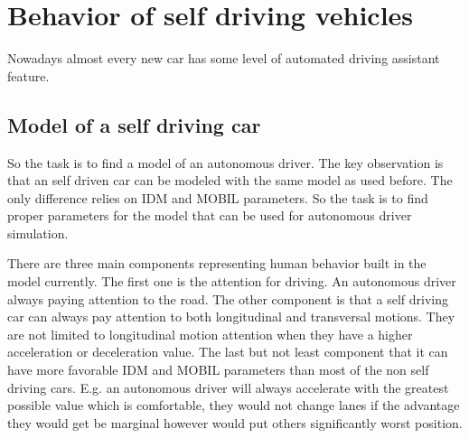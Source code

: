\chapter{Behavior of self driving vehicles}
		Nowadays almost every new car has some level of automated driving assistant feature.
	\section{Model of a self driving car}
		So the task is to find a model of an autonomous driver. The key observation is that an self driven car can be modeled with the same model as used before. The only difference relies on IDM and MOBIL parameters. So the task is to find proper parameters for the model that can be used for autonomous driver simulation.

		There are three main components representing human behavior built in the model currently. The first one is the attention for driving. An autonomous driver always paying attention to the road. The other component is that a self driving car can always pay attention to both longitudinal and transversal motions. They are not limited to longitudinal motion attention when they have a higher acceleration or deceleration value. The last but not least component that it can have more favorable IDM and MOBIL parameters than most of the non self driving cars. E.g. an autonomous driver will always accelerate with the greatest possible value which is comfortable, they would not change lanes if the advantage they would get be marginal however would put others significantly worst position.